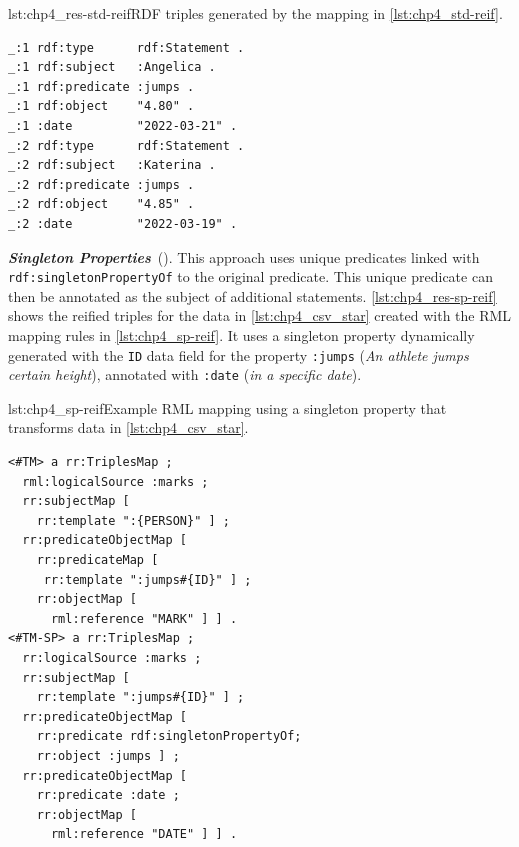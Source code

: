 \begin{minipage}{\linewidth}
\begin{captionedlisting}{lst:chp4_res-std-reif}{RDF triples generated by the mapping in \cref{lst:chp4_std-reif}.}
\centering
\begin{multicols}{2}
{\begin{lstlisting}[basicstyle=\ttfamily\small,label={list:example1},columns=flexible]
_:1 rdf:type      rdf:Statement .
_:1 rdf:subject   :Angelica .
_:1 rdf:predicate :jumps .
_:1 rdf:object    "4.80" .
_:1 :date         "2022-03-21" .
_:2 rdf:type      rdf:Statement .
_:2 rdf:subject   :Katerina .
_:2 rdf:predicate :jumps .
_:2 rdf:object    "4.85" .
_:2 :date         "2022-03-19" .
\end{lstlisting}}
\end{multicols}
\end{captionedlisting}
\end{minipage}



\noindent\textbf{\textit{Singleton Properties}}~(\cite{nguyen2014don}). This approach uses unique predicates linked with \texttt{rdf:singletonPropertyOf} to the original predicate. 
This unique predicate can then be annotated as the subject of additional statements. 
\cref{lst:chp4_res-sp-reif} shows the reified triples for the data in \cref{lst:chp4_csv_star} created with the RML mapping rules in \cref{lst:chp4_sp-reif}. 
It uses a singleton property dynamically generated with the \texttt{ID} data field for the property \texttt{:jumps} (\textit{An athlete jumps certain height}), annotated with \texttt{:date} (\textit{in a specific date}).


\begin{minipage}{\linewidth}
\begin{captionedlisting}{lst:chp4_sp-reif}{Example RML mapping using a singleton property that transforms data in \cref{lst:chp4_csv_star}.}
\centering
\begin{multicols}{2}
{\begin{lstlisting}[basicstyle=\ttfamily\small,label={list:example1},columns=flexible]
<#TM> a rr:TriplesMap ;
  rml:logicalSource :marks ;
  rr:subjectMap [ 
    rr:template ":{PERSON}" ] ;
  rr:predicateObjectMap [ 
    rr:predicateMap [
     rr:template ":jumps#{ID}" ] ;
    rr:objectMap [
      rml:reference "MARK" ] ] .
<#TM-SP> a rr:TriplesMap ;
  rr:logicalSource :marks ;
  rr:subjectMap [ 
    rr:template ":jumps#{ID}" ] ;
  rr:predicateObjectMap [ 
    rr:predicate rdf:singletonPropertyOf;
    rr:object :jumps ] ;
  rr:predicateObjectMap [ 
    rr:predicate :date ;
    rr:objectMap [
      rml:reference "DATE" ] ] .
\end{lstlisting}}
\end{multicols}
\end{captionedlisting}
\end{minipage}



